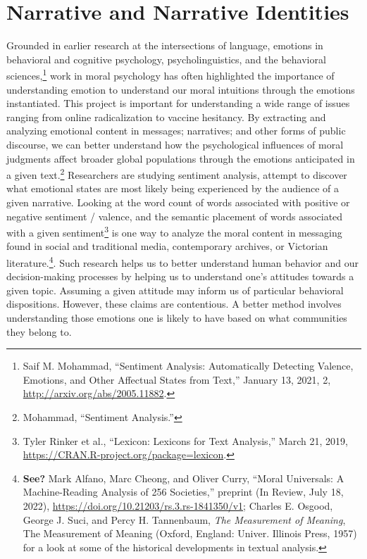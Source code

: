 \documentclass[phdthesis,12pt,final]{wuthesis}
\theoremstyle{definition}
\theoremstyle{definition}
\theoremstyle{definition}
\theoremstyle{definition}
\theoremstyle{remark}
\begin{document}
\section{Narrative and Narrative Identities}\label{narrative-and-narrative-identities}

Grounded in earlier research at the intersections of language, emotions in behavioral and cognitive psychology, psycholinguistics, and the behavioral sciences,\footnote{Saif M. Mohammad, {``Sentiment {Analysis}: {Automatically Detecting Valence}, {Emotions}, and {Other Affectual States} from {Text},''} January 13, 2021, 2, \url{http://arxiv.org/abs/2005.11882}.} work in moral psychology has often highlighted the importance of understanding emotion to understand our moral intuitions through the emotions instantiated. This project is important for understanding a wide range of issues ranging from online radicalization to vaccine hesitancy. By extracting and analyzing emotional content in messages; narratives; and other forms of public discourse, we can better understand how the psychological influences of moral judgments affect broader global populations through the emotions anticipated in a given text.\footnote{Mohammad, {``Sentiment {Analysis}.''}} Researchers are studying sentiment analysis, attempt to discover what emotional states are most likely being experienced by the audience of a given narrative. Looking at the word count of words associated with positive or negative sentiment / valence, and the semantic placement of words associated with a given sentiment\footnote{Tyler Rinker et al., {``Lexicon: {Lexicons} for {Text Analysis},''} March 21, 2019, \url{https://CRAN.R-project.org/package=lexicon}.} is one way to analyze the moral content in messaging found in social and traditional media, contemporary archives, or Victorian literature.\footnote{\textbf{See?} Mark Alfano, Marc Cheong, and Oliver Curry, {``Moral {Universals}: {A} Machine-Reading Analysis of 256 Societies,''} preprint (In Review, July 18, 2022), \url{https://doi.org/10.21203/rs.3.rs-1841350/v1}; Charles E. Osgood, George J. Suci, and Percy H. Tannenbaum, \emph{The Measurement of Meaning}, The Measurement of Meaning (Oxford, England: Univer. Illinois Press, 1957) for a look at some of the historical developments in textual analysis.}. Such research helps us to better understand human behavior and our decision-making processes by helping us to understand one's attitudes towards a given topic. Assuming a given attitude may inform us of particular behavioral dispositions. However, these claims are contentious. A better method involves understanding those emotions one is likely to have based on what communities they belong to.
\end{document}
